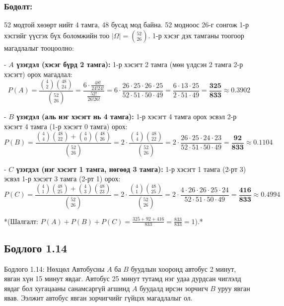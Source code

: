 \documentclass[11pt,a4paper]{article}
\begin{document}
\subsubsection*{Бодолт:}

52 модтой хөзөрт нийт 4 тамга, 48 бусад мод байна. 52 модноос 26-г сонгож 1-р хэсгийг үүсгэх бүх боломжийн тоо $|\Omega| = \binom{52}{26}$. 1-р хэсэг дэх тамганы тоогоор магадлалыг тооцоолно:

- 				\textbf{$A$ үзэгдэл (хэсэг бүрд 2 тамга):}
  1-р хэсэгт 2 тамга (мөн үлдсэн 2 тамга 2-р хэсэгт) орох магадлал:
  \[
    P(A) = \frac{\binom{4}{2}\binom{48}{24}}{\binom{52}{26}} = \frac{6 \cdot \frac{48!}{24!24!}}{\frac{52!}{26!26!}} = 6 \cdot \frac{26 \cdot 25 \cdot 26 \cdot 25}{52 \cdot 51 \cdot 50 \cdot 49} = \frac{6 \cdot 13 \cdot 25}{2 \cdot 51 \cdot 49} = \mathbf{\frac{325}{833} \approx 0.3902}
  \]

- 				\textbf{$B$ үзэгдэл (аль нэг хэсэгт нь 4 тамга):}
  1-р хэсэгт 4 тамга орох эсвэл 2-р хэсэгт 4 тамга (1-р хэсэгт 0 тамга) орох:
  \[
    P(B) = \frac{\binom{4}{4}\binom{48}{22} + \binom{4}{0}\binom{48}{26}}{\binom{52}{26}} = 2 \cdot \frac{\binom{4}{4}\binom{48}{22}}{\binom{52}{26}} = 2 \cdot \frac{26 \cdot 25 \cdot 24 \cdot 23}{52 \cdot 51 \cdot 50 \cdot 49} = \mathbf{\frac{92}{833} \approx 0.1104}
  \]

- 				\textbf{$C$ үзэгдэл (нэг хэсэгт 1 тамга, нөгөөд 3 тамга):}
  1-р хэсэгт 1 тамга (2-рт 3) эсвэл 1-р хэсэгт 3 тамга (2-рт 1) орох:
  \[
    P(C) = \frac{\binom{4}{1}\binom{48}{25} + \binom{4}{3}\binom{48}{23}}{\binom{52}{26}} = 2 \cdot \frac{\binom{4}{1}\binom{48}{25}}{\binom{52}{26}} = 2 \cdot \frac{4 \cdot 26 \cdot 26 \cdot 25 \cdot 24}{52 \cdot 51 \cdot 50 \cdot 49} = \mathbf{\frac{416}{833} \approx 0.4994}
  \]

*(Шалгалт: $P(A) + P(B) + P(C) = \frac{325 + 92 + 416}{833} = \frac{833}{833} = 1$).*

\vspace{0.8em}

\subsection*{Бодлого 1.14}

\begin{problembox}{Бодлого 1.14: Нөхцөл}
Автобусны $A$ ба $B$ буудлын хооронд автобус 2 минут, явган хүн 15 минут явдаг. Автобус 25 минут тутамд нэг удаа дурдсан чиглэлд явдаг бол хугацааны санамсаргүй агшинд $A$ буудалд ирсэн зорчигч $B$ уруу явган явав. Ээлжит автобус явган зорчигчийг гүйцэх магадлалыг ол.
\end{problembox}
\end{document}
